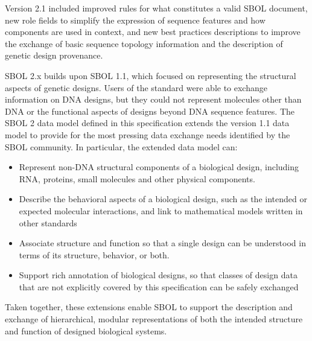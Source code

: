 Version 2.1 included improved rules for what constitutes a valid SBOL document, new role fields to simplify the expression of sequence features and how components are used in context, and new best practices descriptions to improve the exchange of basic sequence topology information and the description of genetic design provenance.

SBOL 2.x builds upon SBOL 1.1, which focused on representing the structural aspects of genetic designs. Users of the standard were able to exchange information on DNA designs, but they could not represent molecules other than DNA or the functional aspects of designs beyond DNA sequence features. The SBOL 2 data model defined in this specification extends the version 1.1 data model to provide for the most pressing data exchange needs identified by the SBOL community. In particular, the extended data model can:
\begin{itemize}

\item Represent non-DNA structural components of a biological design, including RNA, proteins, small molecules and other physical components.

\item Describe the behavioral aspects of a biological design, such as the intended or expected molecular interactions, and link to mathematical models written in other standards

\item Associate structure and function so that a single design can be understood in terms of its structure, behavior, or both.

\item Support rich annotation of biological designs, so that classes of design data that are not explicitly covered by this specification can be safely exchanged

\end{itemize}
Taken together, these extensions enable SBOL to support the description and exchange of hierarchical, modular representations of both the intended structure and function of designed biological systems.

